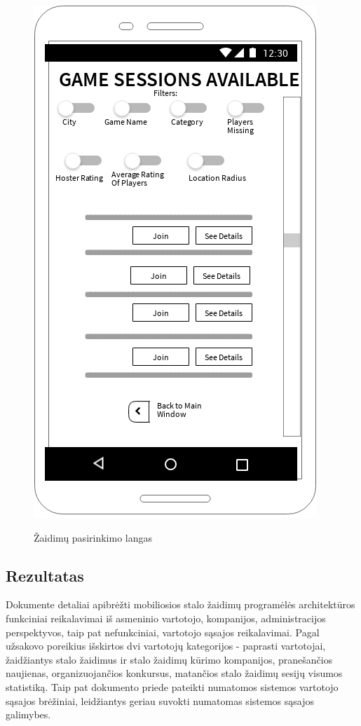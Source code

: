 \documentclass{VUMIFPSkursinis}
\begin{document}
\begin{figure}[H]
	\centering
	\caption{Žaidimų pasirinkimo langas}
	\includegraphics[scale=0.9]{img/game_sessions_view}
	\label{img:game_sessions_view}
\end{figure}

\subsection{Rezultatas}
Dokumente detaliai apibrėžti mobiliosios stalo žaidimų programėlės architektūros funkciniai reikalavimai iš asmeninio vartotojo, kompanijos, administracijos perspektyvos, taip pat nefunkciniai, vartotojo sąsajos reikalavimai. Pagal užsakovo poreikius išskirtos dvi vartotojų kategorijos - paprasti vartotojai, žaidžiantys stalo žaidimus ir stalo žaidimų kūrimo kompanijos, pranešančios naujienas, organizuojančios konkursus, matančios stalo žaidimų sesijų visumos statistiką. Taip pat dokumento priede pateikti numatomos sistemos vartotojo sąsajos brėžiniai, leidžiantys geriau suvokti numatomas sistemos sąsajos galimybes.
\end{document}
